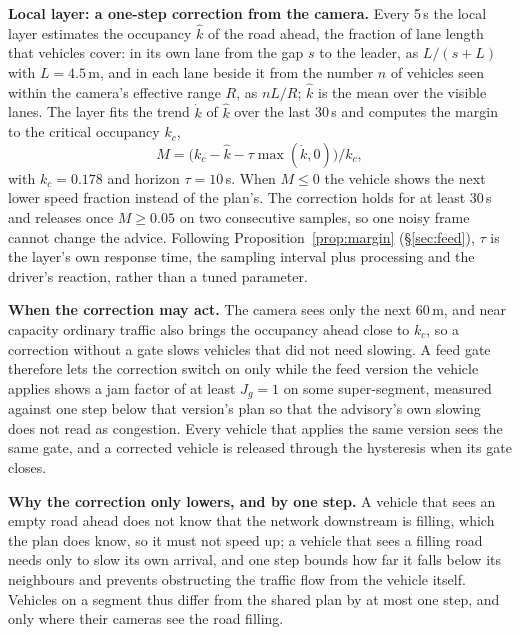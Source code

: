 \noindent\textbf{Local layer: a one-step correction from the camera.} Every 5\,s the local layer estimates the occupancy $\hat k$ of the road ahead, the fraction of lane length that vehicles cover: in its own lane from the gap $s$ to the leader, as $L/(s+L)$ with $L=4.5$\,m, and in each lane beside it from the number $n$ of vehicles seen within the camera's effective range $R$, as $nL/R$; $\hat k$ is the mean over the visible lanes. The layer fits the trend $\dot k$ of $\hat k$ over the last 30\,s and computes the margin to the critical occupancy $k_c$,
\begin{equation}
M=\bigl(k_c-\hat k-\tau\max(\dot k,0)\bigr)/k_c,
\label{eq:margin}
\end{equation}
with $k_c=0.178$ and horizon $\tau=10$\,s. When $M\le 0$ the vehicle shows the next lower speed fraction instead of the plan's. The correction holds for at least 30\,s and releases once $M\ge 0.05$ on two consecutive samples, so one noisy frame cannot change the advice. Following Proposition~\ref{prop:margin} (\S\ref{sec:feed}), $\tau$ is the layer's own response time, the sampling interval plus processing and the driver's reaction, rather than a tuned parameter.

\noindent\textbf{When the correction may act.} The camera sees only the next 60\,m, and near capacity ordinary traffic also brings the occupancy ahead close to $k_c$, so a correction without a gate slows vehicles that did not need slowing. A feed gate therefore lets the correction switch on only while the feed version the vehicle applies shows a jam factor of at least $J_g=1$ on some super-segment, measured against one step below that version's plan so that the advisory's own slowing does not read as congestion. Every vehicle that applies the same version sees the same gate, and a corrected vehicle is released through the hysteresis when its gate closes.

\noindent\textbf{Why the correction only lowers, and by one step.} A vehicle that sees an empty road ahead does not know that the network downstream is filling, which the plan does know, so it must not speed up; a vehicle that sees a filling road needs only to slow its own arrival, and one step bounds how far it falls below its neighbours and prevents obstructing the traffic flow from the vehicle itself. Vehicles on a segment thus differ from the shared plan by at most one step, and only where their cameras see the road filling.
